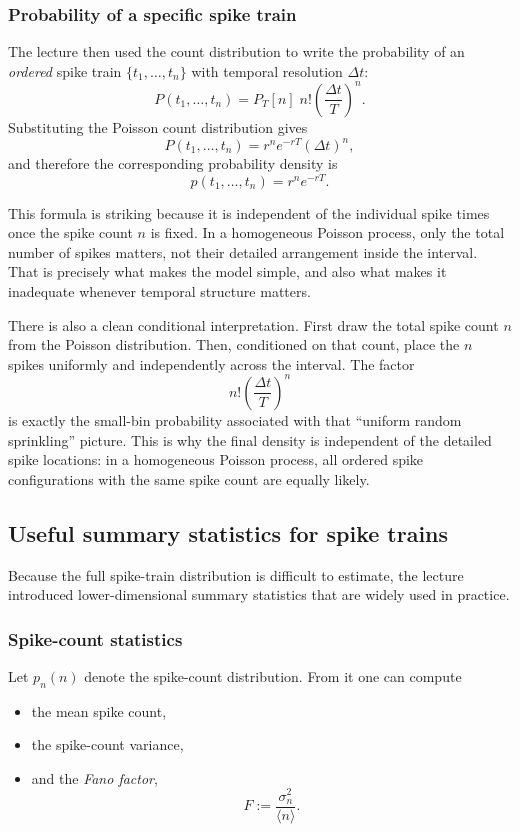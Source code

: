 \documentclass[11pt]{article}
\begin{document}
\subsubsection{Probability of a specific spike train}

The lecture then used the count distribution to write the probability of an \emph{ordered} spike train $\{t_1,\dots,t_n\}$ with temporal resolution $\Delta t$:
\[
P(t_1,\dots,t_n) = P_T[n]\; n!\left(\frac{\Delta t}{T}\right)^n.
\]
Substituting the Poisson count distribution gives
\[
P(t_1,\dots,t_n)= r^n e^{-rT}(\Delta t)^n,
\]
and therefore the corresponding probability density is
\[
p(t_1,\dots,t_n)=r^n e^{-rT}.
\]

This formula is striking because it is independent of the individual spike times once the spike count $n$ is fixed. In a homogeneous Poisson process, only the total number of spikes matters, not their detailed arrangement inside the interval. That is precisely what makes the model simple, and also what makes it inadequate whenever temporal structure matters.

There is also a clean conditional interpretation. First draw the total spike count $n$ from the Poisson distribution. Then, conditioned on that count, place the $n$ spikes uniformly and independently across the interval. The factor
\[
n!\left(\frac{\Delta t}{T}\right)^n
\]
is exactly the small-bin probability associated with that ``uniform random sprinkling'' picture. This is why the final density is independent of the detailed spike locations: in a homogeneous Poisson process, all ordered spike configurations with the same spike count are equally likely.

\subsection{Useful summary statistics for spike trains}

Because the full spike-train distribution is difficult to estimate, the lecture introduced lower-dimensional summary statistics that are widely used in practice.

\subsubsection{Spike-count statistics}

Let $p_n(n)$ denote the spike-count distribution. From it one can compute
\begin{itemize}
    \item the mean spike count,
    \item the spike-count variance,
    \item and the \emph{Fano factor},
    \[
    F := \frac{\sigma_n^2}{\langle n \rangle}.
    \]
\end{itemize}
\end{document}
